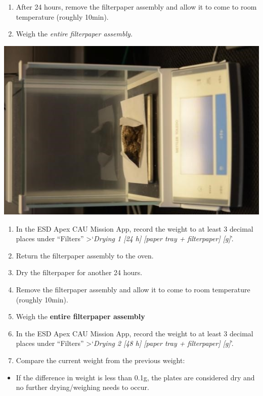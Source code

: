 \documentclass[]{book}
\providecommand{\tightlist}{%
  \setlength{\itemsep}{0pt}\setlength{\parskip}{0pt}}
\begin{document}
\begin{enumerate}
\def\labelenumi{\arabic{enumi}.}
\setcounter{enumi}{1}
\item
  After 24 hours, remove the filterpaper assembly and allow it to come to room temperature (roughly 10min).
\item
  Weigh the \emph{entire filterpaper assembly.}
\end{enumerate}

\includegraphics{images/CAU_weigh.jpg}

\begin{enumerate}
\def\labelenumi{\arabic{enumi}.}
\setcounter{enumi}{3}
\item
  In the ESD Apex CAU Mission App, record the weight to at least 3 decimal places under ``Filters'' \textgreater{}`\emph{Drying 1 {[}24 h{]} {[}paper tray + filterpaper{]} {[}g{]}}'.
\item
  Return the filterpaper assembly to the oven.
\item
  Dry the filterpaper for another 24 hours.
\item
  Remove the filterpaper assembly and allow it to come to room temperature (roughly 10min).
\item
  Weigh the \textbf{entire filterpaper assembly}
\item
  In the ESD Apex CAU Mission App, record the weight to at least 3 decimal places under ``Filters'' \textgreater{}`\emph{Drying 2 {[}48 h{]} {[}paper tray + filterpaper{]} {[}g{]}}'.
\item
  Compare the current weight from the previous weight:
\end{enumerate}

\begin{itemize}
\tightlist
\item
  If the difference in weight is less than 0.1g, the plates are considered dry and no further drying/weighing needs to occur.
\end{itemize}
\end{document}
